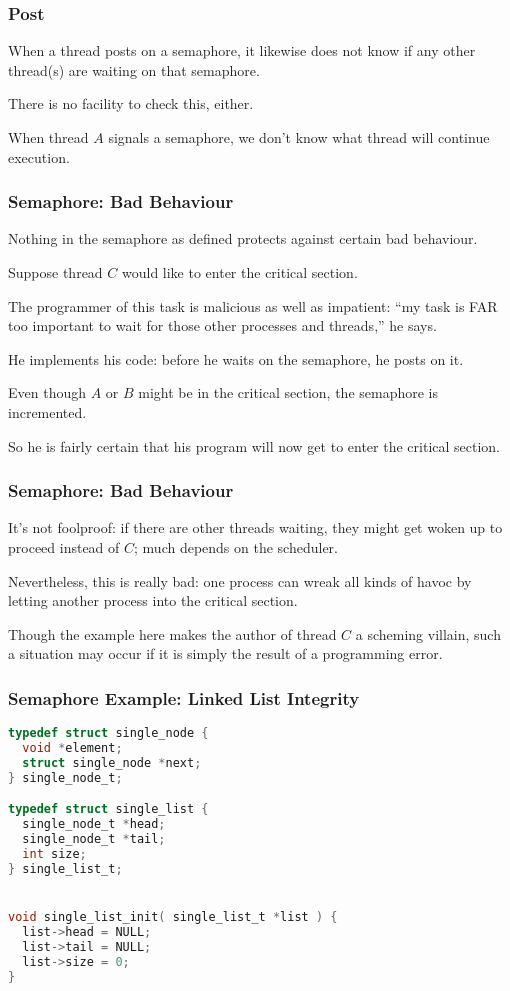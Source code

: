 \begin{frame}
	\frametitle{Post}

	When a thread posts on a semaphore, it likewise does not know if any other thread(s) are waiting on that semaphore.

	There is no facility to check this, either.

	When thread $A$ signals a semaphore, we don't know what thread will continue execution.


\end{frame}

\begin{frame}
	\frametitle{Semaphore: Bad Behaviour}

	Nothing in the semaphore as defined protects against certain bad behaviour.

	Suppose thread $C$ would like to enter the critical section.

	The programmer of this task is malicious as well as impatient: ``my task is FAR too important to wait for those other processes and threads,'' he says.

	He implements his code: before he waits on the semaphore, he posts on it.

	Even though $A$ or $B$ might be in the critical section, the semaphore is incremented.

	So he is fairly certain that his program will now get to enter the critical section.
\end{frame}

\begin{frame}
	\frametitle{Semaphore: Bad Behaviour}

	It's not foolproof: if there are other threads waiting, they might get woken up to proceed instead of $C$; much depends on the scheduler.

	Nevertheless, this is really bad: one process can wreak all kinds of havoc by letting another process into the critical section.

	Though the example here makes the author of thread $C$ a scheming villain, such a situation may occur if it is simply the result of a programming error.

\end{frame}

\begin{frame}[fragile]
	\frametitle{Semaphore Example: Linked List Integrity}

	\begin{lstlisting}[language=C]
typedef struct single_node {
  void *element;
  struct single_node *next;
} single_node_t;

typedef struct single_list {
  single_node_t *head;
  single_node_t *tail;
  int size;
} single_list_t;


void single_list_init( single_list_t *list ) {
  list->head = NULL;
  list->tail = NULL;
  list->size = 0;
}
	\end{lstlisting}
\end{frame}

